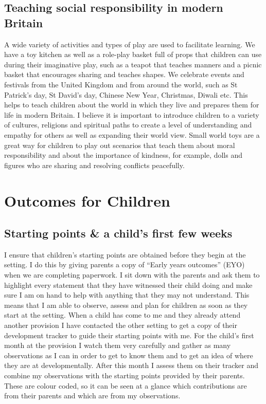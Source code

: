 \documentclass[10pt,a4paper]{report}
\begin{document}
\section{Teaching social responsibility in modern Britain}

A wide variety of activities and types of play are used to facilitate learning. We have a toy kitchen as well as a role-play basket full of props that children can use during their imaginative play, such as a teapot that teaches manners and a picnic basket that encourages sharing and teaches shapes. We celebrate events and festivals from the United Kingdom and from around the world, such as St Patrick's day, St David's day, Chinese New Year, Christmas, Diwali etc. This helps to teach children about the world in which they live and prepares them for life in modern Britain. I believe it is important to introduce children to a variety of cultures, religions and spiritual paths to create a level of understanding and empathy for others as well as expanding their world view. Small world toys are a great way for children to play out scenarios that teach them about moral responsibility and about the importance of kindness, for example, dolls and figures who are sharing and resolving conflicts peacefully.

\chapter{Outcomes for Children}

\section{Starting points \& a child's first few weeks}

I ensure that children's starting points are obtained before they begin at the setting. I do this by giving parents a copy of “Early years outcomes” (EYO) when we are completing paperwork. I sit down with the parents and ask them to highlight every statement that they have witnessed their child doing and make sure I am on hand to help with anything that they may not understand. This means that I am able to observe, assess and plan for children as soon as they start at the setting. When a child has come to me and they already attend another provision I have contacted the other setting to get a copy of their development tracker to guide their starting points with me. For the child's first month at the provision I watch them very carefully and gather as many observations as I can in order to get to know them and to get an idea of where they are at developmentally. After this month I assess them on their tracker and combine my observations with the starting points provided by their parents. These are colour coded, so it can be seen at a glance which contributions are from their parents and which are from my observations.
\end{document}
